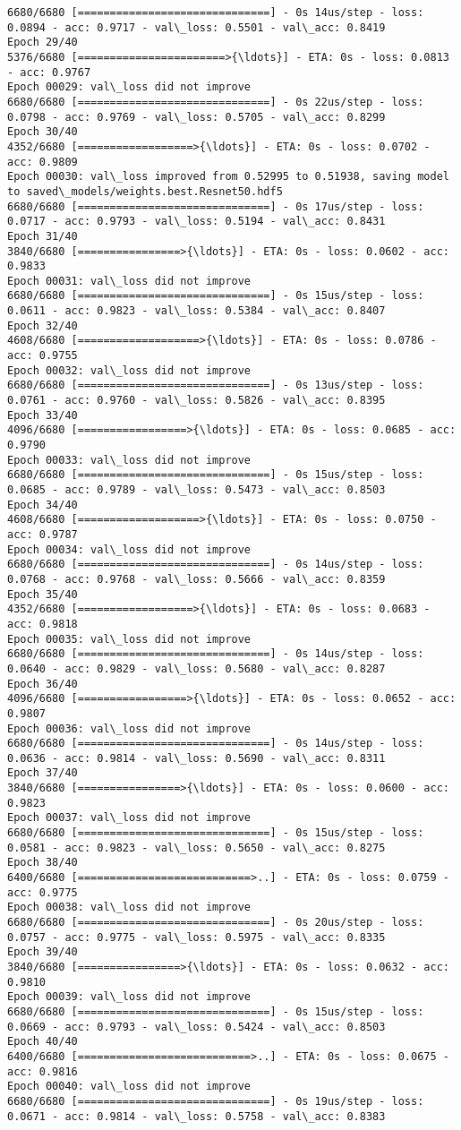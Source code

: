 \documentclass[11pt]{article}
\begin{document}
\begin{Verbatim}[commandchars=\\\{\}]
6680/6680 [==============================] - 0s 14us/step - loss: 0.0894 - acc: 0.9717 - val\_loss: 0.5501 - val\_acc: 0.8419
Epoch 29/40
5376/6680 [=======================>{\ldots}] - ETA: 0s - loss: 0.0813 - acc: 0.9767
Epoch 00029: val\_loss did not improve
6680/6680 [==============================] - 0s 22us/step - loss: 0.0798 - acc: 0.9769 - val\_loss: 0.5705 - val\_acc: 0.8299
Epoch 30/40
4352/6680 [==================>{\ldots}] - ETA: 0s - loss: 0.0702 - acc: 0.9809
Epoch 00030: val\_loss improved from 0.52995 to 0.51938, saving model to saved\_models/weights.best.Resnet50.hdf5
6680/6680 [==============================] - 0s 17us/step - loss: 0.0717 - acc: 0.9793 - val\_loss: 0.5194 - val\_acc: 0.8431
Epoch 31/40
3840/6680 [================>{\ldots}] - ETA: 0s - loss: 0.0602 - acc: 0.9833
Epoch 00031: val\_loss did not improve
6680/6680 [==============================] - 0s 15us/step - loss: 0.0611 - acc: 0.9823 - val\_loss: 0.5384 - val\_acc: 0.8407
Epoch 32/40
4608/6680 [===================>{\ldots}] - ETA: 0s - loss: 0.0786 - acc: 0.9755
Epoch 00032: val\_loss did not improve
6680/6680 [==============================] - 0s 13us/step - loss: 0.0761 - acc: 0.9760 - val\_loss: 0.5826 - val\_acc: 0.8395
Epoch 33/40
4096/6680 [=================>{\ldots}] - ETA: 0s - loss: 0.0685 - acc: 0.9790
Epoch 00033: val\_loss did not improve
6680/6680 [==============================] - 0s 15us/step - loss: 0.0685 - acc: 0.9789 - val\_loss: 0.5473 - val\_acc: 0.8503
Epoch 34/40
4608/6680 [===================>{\ldots}] - ETA: 0s - loss: 0.0750 - acc: 0.9787
Epoch 00034: val\_loss did not improve
6680/6680 [==============================] - 0s 14us/step - loss: 0.0768 - acc: 0.9768 - val\_loss: 0.5666 - val\_acc: 0.8359
Epoch 35/40
4352/6680 [==================>{\ldots}] - ETA: 0s - loss: 0.0683 - acc: 0.9818
Epoch 00035: val\_loss did not improve
6680/6680 [==============================] - 0s 14us/step - loss: 0.0640 - acc: 0.9829 - val\_loss: 0.5680 - val\_acc: 0.8287
Epoch 36/40
4096/6680 [=================>{\ldots}] - ETA: 0s - loss: 0.0652 - acc: 0.9807
Epoch 00036: val\_loss did not improve
6680/6680 [==============================] - 0s 14us/step - loss: 0.0636 - acc: 0.9814 - val\_loss: 0.5690 - val\_acc: 0.8311
Epoch 37/40
3840/6680 [================>{\ldots}] - ETA: 0s - loss: 0.0600 - acc: 0.9823
Epoch 00037: val\_loss did not improve
6680/6680 [==============================] - 0s 15us/step - loss: 0.0581 - acc: 0.9823 - val\_loss: 0.5650 - val\_acc: 0.8275
Epoch 38/40
6400/6680 [===========================>..] - ETA: 0s - loss: 0.0759 - acc: 0.9775
Epoch 00038: val\_loss did not improve
6680/6680 [==============================] - 0s 20us/step - loss: 0.0757 - acc: 0.9775 - val\_loss: 0.5975 - val\_acc: 0.8335
Epoch 39/40
3840/6680 [================>{\ldots}] - ETA: 0s - loss: 0.0632 - acc: 0.9810
Epoch 00039: val\_loss did not improve
6680/6680 [==============================] - 0s 15us/step - loss: 0.0669 - acc: 0.9793 - val\_loss: 0.5424 - val\_acc: 0.8503
Epoch 40/40
6400/6680 [===========================>..] - ETA: 0s - loss: 0.0675 - acc: 0.9816
Epoch 00040: val\_loss did not improve
6680/6680 [==============================] - 0s 19us/step - loss: 0.0671 - acc: 0.9814 - val\_loss: 0.5758 - val\_acc: 0.8383


\end{Verbatim}
\end{document}
